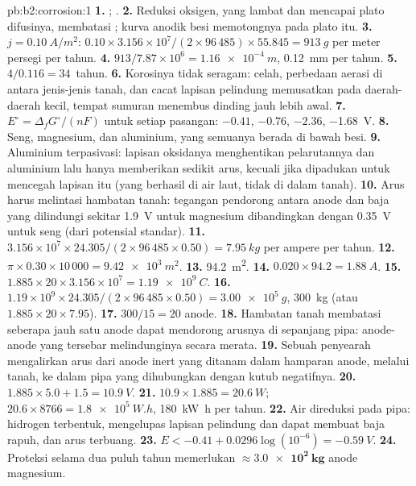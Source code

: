 \begin{solution}{pb:b2:corrosion:1}
\textbf{1.} ; .
\textbf{2.} Reduksi oksigen, yang lambat dan mencapai plato difusinya,
membatasi ; kurva anodik besi memotongnya pada plato itu.
\textbf{3.} $j = \qty{0.10}{A/m^2}$: $0.10 \times 3.156 \times 10^7/(2 \times 96\,485)
\times 55.845 = \qty{913}{g}$ per meter persegi per tahun.
\textbf{4.} $913/7.87 \times 10^6 = \qty{1.16e-4}{m}$, \qty{0.12}{mm} per tahun.
\textbf{5.} $4/0.116 = 34$~tahun.
\textbf{6.} Korosinya tidak seragam: celah, perbedaan aerasi di antara
jenis-jenis tanah, dan cacat lapisan pelindung memusatkan  pada
daerah-daerah kecil, tempat sumuran menembus dinding jauh lebih awal.
\textbf{7.} $E^\circ = \Delta_f G^\circ/(nF)$ untuk setiap pasangan: 
$-0.41$,  $-0.76$,  $-2.36$,  \qty{-1.68}{V}.
\textbf{8.} Seng, magnesium, dan aluminium, yang semuanya berada di bawah
besi.
\textbf{9.} Aluminium terpasivasi: lapisan oksidanya menghentikan
pelarutannya dan aluminium lalu hanya memberikan sedikit arus, kecuali jika
dipadukan untuk mencegah lapisan itu (yang berhasil di air laut, tidak di
dalam tanah).
\textbf{10.} Arus harus melintasi hambatan tanah: tegangan pendorong antara
anode dan baja yang dilindungi sekitar \qty{1.9}{V} untuk magnesium
dibandingkan dengan \qty{0.35}{V} untuk seng (dari potensial standar).
\textbf{11.} $3.156 \times 10^7 \times 24.305/(2 \times 96\,485 \times 0.50) =
\qty{7.95}{kg}$ per ampere per tahun.
\textbf{12.} $\pi \times 0.30 \times 10\,000 = \qty{9.42e3}{m^2}$.
\textbf{13.} \qty{94.2}{m^2}.
\textbf{14.} $0.020 \times 94.2 = \qty{1.88}{A}$.
\textbf{15.} $1.885 \times 20 \times 3.156 \times 10^7 = \qty{1.19e9}{C}$.
\textbf{16.} $1.19 \times 10^9 \times 24.305/(2 \times 96\,485 \times 0.50) =
\qty{3.00e5}{g}$, \qty{300}{kg} (atau $1.885 \times 20 \times 7.95$).
\textbf{17.} $300/15 = 20$ anode.
\textbf{18.} Hambatan tanah membatasi seberapa jauh satu anode dapat
mendorong arusnya di sepanjang pipa: anode-anode yang tersebar
melindunginya secara merata.
\textbf{19.} Sebuah penyearah mengalirkan arus dari anode inert yang
ditanam dalam hamparan anode, melalui tanah, ke dalam pipa yang dihubungkan
dengan kutub negatifnya.
\textbf{20.} $1.885 \times 5.0 + 1.5 = \qty{10.9}{V}$.
\textbf{21.} $10.9 \times 1.885 = \qty{20.6}{W}$; $20.6 \times 8766 = \qty{1.8e5}{W.h}$,
\qty{180}{kW.h} per tahun.
\textbf{22.} Air direduksi pada pipa: hidrogen terbentuk, mengelupas
lapisan pelindung dan dapat membuat baja rapuh, dan arus terbuang.
\textbf{23.} $E < -0.41 + 0.0296\log(10^{-6}) = \qty{-0.59}{V}$.
\textbf{24.} Proteksi selama dua puluh tahun memerlukan
$\boldsymbol{\approx \qty{3.0e2}{kg}}$ anode magnesium.
\end{solution}
